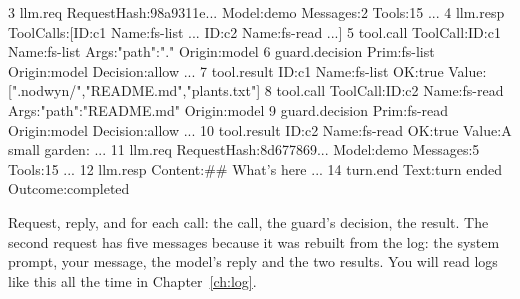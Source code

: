 \begin{txt}
    3 llm.req         {RequestHash:98a9311e... Model:demo Messages:2 Tools:15 ...}
    4 llm.resp        {ToolCalls:[{ID:c1 Name:fs-list ...} {ID:c2 Name:fs-read ...}]}
    5 tool.call       {ToolCall:{ID:c1 Name:fs-list Args:{"path":"."}} Origin:model}
    6 guard.decision  {Prim:fs-list Origin:model Decision:allow ...}
    7 tool.result     {ID:c1 Name:fs-list OK:true Value:[".nodwyn/","README.md","plants.txt"]}
    8 tool.call       {ToolCall:{ID:c2 Name:fs-read Args:{"path":"README.md"}} Origin:model}
    9 guard.decision  {Prim:fs-read Origin:model Decision:allow ...}
   10 tool.result     {ID:c2 Name:fs-read OK:true Value:A small garden: ...}
   11 llm.req         {RequestHash:8d677869... Model:demo Messages:5 Tools:15 ...}
   12 llm.resp        {Content:## What's here ...}
   14 turn.end        {Text:turn ended Outcome:completed}
\end{txt}

Request, reply, and for each call: the call, the guard's decision, the
result. The second request has five messages because it was rebuilt from
the log: the system prompt, your message, the model's reply and the two
results. You will read logs like this all the time in
Chapter~\ref{ch:log}.
